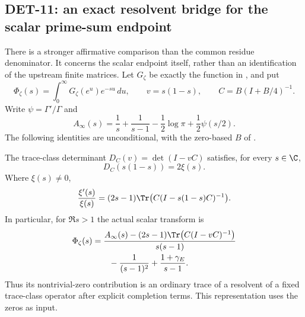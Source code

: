 \subsection{DET-11: an exact resolvent bridge for the scalar prime-sum endpoint}
There is a stronger affirmative comparison than the common residue denominator. It concerns the scalar endpoint itself, rather than an identification of the upstream finite matrices. Let $G_\zeta$ be exactly the function in , and put
\[
 \Phi_\zeta(s)=\int_0^\infty G_\zeta(e^u)e^{-su}\,du,
 \qquad v=s(1-s),\qquad C=B(I+B/4)^{-1}.
\]
Write $\psi=\Gamma'/\Gamma$ and
\[
 A_\infty(s)=\frac1s+\frac1{s-1}-\frac12\log\pi+
 \frac12\psi(s/2).
\]
The following identities are unconditional, with the zero-based $B$ of .
\begin{proposition}
The trace-class determinant $D_C(v)=\det(I-vC)$ satisfies, for every $s\in\C$,
\begin{equation}\label{eq:Cdetcompletion}
 D_C(s(1-s))=2\xi(s).
\end{equation}
Where $\xi(s)\ne0$,
\begin{equation}\label{eq:Cresolvent}
 \frac{\xi'(s)}{\xi(s)}=(2s-1)\Tr\bigl(C(I-s(1-s)C)^{-1}\bigr).
\end{equation}
In particular, for $\Re s>1$ the actual scalar transform is
\begin{align}\label{eq:Phiresolvent}
 \Phi_\zeta(s)
 &=\frac{A_\infty(s)-(2s-1)\Tr\bigl(C(I-vC)^{-1}\bigr)}{s(s-1)}\notag\\
 &\hspace{7mm}-\frac1{(s-1)^2}+\frac{1+\gamma_E}{s-1}.
\end{align}
Thus its nontrivial-zero contribution is an ordinary trace of a resolvent of a fixed trace-class operator after explicit completion terms. This representation uses the zeros as input.
\end{proposition}
